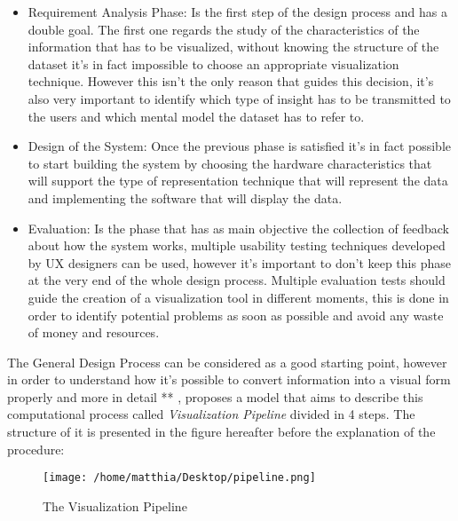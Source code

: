 \documentclass[10p,letterpaper]{article}
\begin{document}
\begin{itemize}

\item Requirement Analysis Phase: Is the first step of the design process and has a double goal. The first one regards the study of the characteristics of the information that has to be visualized, without knowing the structure of the dataset it's in fact impossible to choose an appropriate visualization technique. However this isn't the only reason that guides this decision, it's also very important to identify which type of insight has to be transmitted to the users and which mental model the dataset has to refer to.
\item Design of the System: Once the previous phase is satisfied it's in fact possible to start building the system by choosing the hardware characteristics that will support the type of representation technique that will represent the data and implementing the software that will display the data. 
\item Evaluation: Is the phase that has as main objective the collection of feedback about how the system works, multiple usability testing techniques developed by UX designers can be used, however it's important to don't keep this phase at the very end of the whole design process. Multiple evaluation tests should guide the creation of a visualization tool in different moments, this is done in order to identify potential problems as soon as possible and avoid any waste of money and resources.  

\end{itemize}  

The General Design Process can be considered as a good starting point, however in order to understand how it's possible to convert information into a visual form properly and more in detail ** , proposes a model that aims to describe this computational process called \textit{Visualization Pipeline} divided in 4 steps. The structure of it is presented in the figure hereafter before the explanation of the procedure:

\begin{figure}[ht!]
\centering
\texttt{[image: /home/matthia/Desktop/pipeline.png]}
\caption{The Visualization Pipeline \label{pipeline}}
\end{figure}
\end{document}
